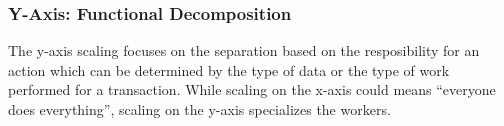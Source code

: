 \subsubsection{Y-Axis: Functional Decomposition}

The y-axis scaling focuses on the separation based on the resposibility for an
action which can be determined by the type of data or the type of work performed
for a transaction. While scaling on the x-axis could means ``everyone does
everything'', scaling on the y-axis specializes the workers.
